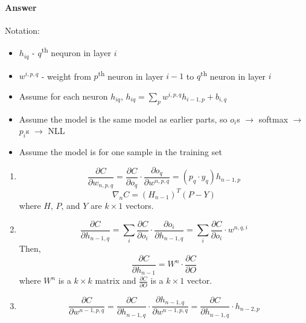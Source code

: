 \documentclass[11pt,twoside]{article}
\begin{document}
\paragraph{Answer}
Notation:
\begin{itemize}
\item $h_{iq}$ - $q$\textsuperscript{th} nequron in layer $i$
\item $w^{i,p,q}$ - weight from $p$\textsuperscript{th} neuron in layer $i-1$ to $q$\textsuperscript{th} neuron in layer $i$
\item Assume for each neuron $h_{iq}$, $h_{iq} = \sum_p w^{i, p, q}h_{i-1, p}+b_{i, q}$
\item Assume the model is the same model as earlier parts, so $o_i$s $\rightarrow$ softmax $\rightarrow$ $p_i$s $\rightarrow$ NLL
\item Assume the model is for one sample in the training set
\end{itemize}
\begin{enumerate}
\item 
\[\frac{\partial C}{\partial w_{n, p, q}} = \frac{\partial C}{\partial o_q} \cdot \frac{\partial o_q}{\partial w^{n, p, q}} = (p_q \cdot y_q)h_{n-1, p}\]
\[\nabla_nC = (H_{n-1})^T(P-Y)\]
where $H$, $P$, and $Y$ are $k \times 1$ vectors.
\item 
\[\frac{\partial C}{\partial h_{n-1, q}} = \sum_i \frac{\partial C}{\partial o_i} \cdot \frac{\partial o_i}{\partial h_{n-1, q}} = \sum_i \frac{\partial C}{\partial o_i} \cdot w^{n, q, i}\]
Then, 
\[\frac{\partial C}{\partial h_{n-1}} = W^n \cdot \frac{\partial C}{\partial O}\]
where $W^n$ is a $k \times k$ matrix and $\frac{\partial C}{\partial O}$ is a $k \times 1$ vector.
\item \[\frac{\partial C}{\partial w^{n-1, p, q}} = \frac{\partial C}{\partial h_{n-1, q}} \cdot \frac{\partial h_{n-1, q}}{\partial w^{n-1, p, q}} = \frac{\partial C}{\partial h_{n-1, q}} \cdot h_{n-2, p}\]
\end{enumerate}
\end{document}

